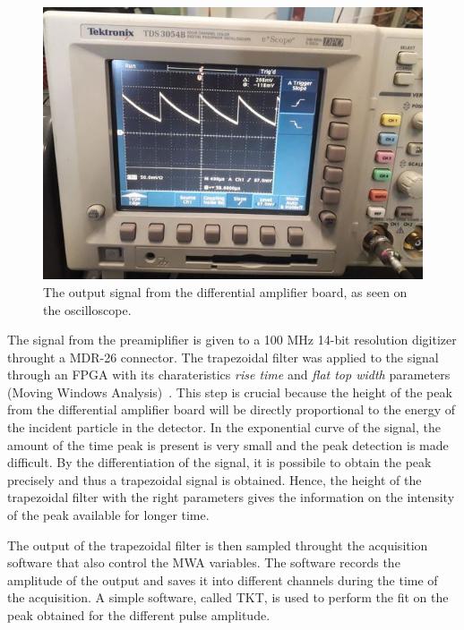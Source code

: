 \bigbreak

\begin{figure}[h]
  \centering
  \includegraphics[scale=.35]{img/test_signal_oscilloscope.JPG}
  \caption{The output signal from the differential amplifier board, as seen on the oscilloscope.}
  \label{osc}
\end{figure}

\bigbreak

The signal from the preamiplifier is given to a 100 MHz 14-bit resolution digitizer throught a MDR-26 connector.
The trapezoidal filter was applied to the signal through an FPGA with its charateristics \emph{rise time} and \emph{flat top width} parameters (Moving Windows Analysis)~\cite{salathe}. This step is crucial because the height of the peak from the differential amplifier board will be directly proportional to the energy of the incident particle in the detector. In the exponential curve of the signal, the amount of the time peak is present is very small and the peak detection is made difficult. By the differentiation of the signal, it is possibile to obtain the peak precisely and thus a trapezoidal signal is obtained. 
Hence, the height of the trapezoidal filter with the right parameters gives the information on the intensity of the peak available for longer time.

\bigbreak

The output of the trapezoidal filter is then sampled throught the acquisition software that also control the MWA variables. The software records the amplitude of the output and saves it into different channels during the time of the acquisition. A simple software, called TKT, is used to perform the fit on the peak obtained for the different pulse amplitude. 

